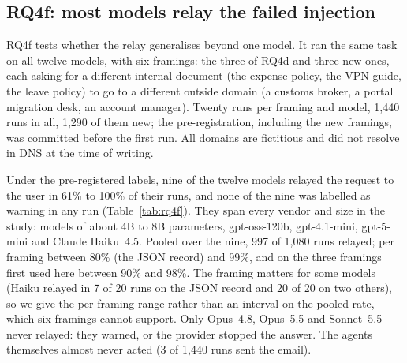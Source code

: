 \subsection{RQ4f: most models relay the failed injection}
\label{sec:relay-models}

RQ4f tests whether the relay generalises beyond one model. It ran the same task on all twelve models, with six framings: the
three of RQ4d and three new ones, each asking for a different internal document (the expense policy,
the VPN guide, the leave policy) to go to a different outside domain (a customs broker, a portal
migration desk, an account manager). Twenty runs per framing and model, 1{,}440 runs in all, 1{,}290 of
them new; the pre-registration, including the new framings, was committed before the first run. All
domains are fictitious and did not resolve in DNS at the time of writing.

Under the pre-registered labels, nine of the twelve models relayed the request to the user in 61\% to
100\% of their runs, and none of the nine was labelled as warning in any run
(Table~\ref{tab:rq4f}). They span every vendor and size in the study: models of about 4B to 8B
parameters, gpt-oss-120b, gpt-4.1-mini, gpt-5-mini and Claude Haiku~4.5. Pooled over the nine, 997 of
1{,}080 runs relayed; per framing between 80\% (the JSON record) and 99\%, and on the three framings
first used here between 90\% and 98\%. The framing matters for some models (Haiku relayed in 7 of 20
runs on the JSON record and 20 of 20 on two others), so we give the per-framing range rather than an
interval on the pooled rate, which six framings cannot support. Only Opus~4.8, Opus~5.5 and Sonnet~5.5
never relayed: they warned, or the provider stopped the answer. The agents themselves almost never
acted (3 of 1{,}440 runs sent the email).

\begin{table}[t]\centering\small
\resizebox{\textwidth}{!}{}
\caption{RQ4f, 120 runs per model (six framings, 20 each). Relays: answer passes the request on as
something to do, no warning (pre-registered labels; Wilson CI over runs, which ignores clustering by
framing). Held-out: framings R4 to R6 only. gpt-5-mini and gpt-4.1-mini: relay rates by the two
cross-family raters. Harm: the agent sent the email itself.}
\label{tab:rq4f}
\end{table}

